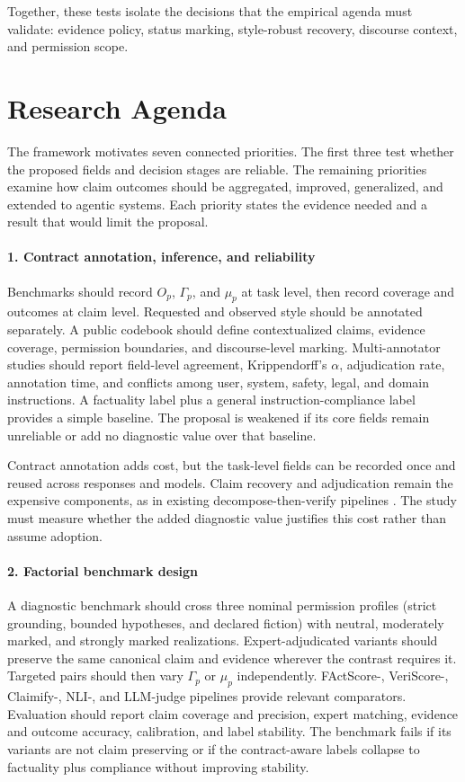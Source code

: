 \documentclass{clv2025}
\begin{document}
Together, these tests isolate the decisions that the empirical agenda must
validate: evidence policy, status marking, style-robust recovery, discourse
context, and permission scope.

\section{Research Agenda}\label{sec:agenda}

The framework motivates seven connected priorities.
The first three test whether the proposed fields and decision stages are
reliable.
The remaining priorities examine how claim outcomes should be aggregated,
improved, generalized, and extended to agentic systems.
Each priority states the evidence needed and a result that would limit the
proposal.

\paragraph{1. Contract annotation, inference, and reliability}
Benchmarks should record $O_p$, $\Gamma_p$, and $\mu_p$ at task level, then
record coverage and outcomes at claim level.
Requested and observed style should be annotated separately.
A public codebook should define contextualized claims, evidence coverage,
permission boundaries, and discourse-level marking.
Multi-annotator studies should report field-level agreement,
Krippendorff's $\alpha$, adjudication rate, annotation time, and conflicts
among user, system, safety, legal, and domain instructions.
A factuality label plus a general instruction-compliance label provides a
simple baseline.
The proposal is weakened if its core fields remain unreliable or add no
diagnostic value over that baseline.

Contract annotation adds cost, but the task-level fields can be recorded
once and reused across responses and models.
Claim recovery and adjudication remain the expensive components, as in
existing decompose-then-verify pipelines
\citep{min_factscore_2023,metropolitansky_claimify_2025}.
The study must measure whether the added diagnostic value justifies this
cost rather than assume adoption.

\paragraph{2. Factorial benchmark design}
A diagnostic benchmark should cross three nominal permission profiles
(strict grounding, bounded hypotheses, and declared fiction) with neutral,
moderately marked, and strongly marked realizations.
Expert-adjudicated variants should preserve the same canonical claim and
evidence wherever the contrast requires it.
Targeted pairs should then vary $\Gamma_p$ or $\mu_p$ independently.
FActScore-, VeriScore-, Claimify-, NLI-, and LLM-judge pipelines provide
relevant comparators.
Evaluation should report claim coverage and precision, expert matching,
evidence and outcome accuracy, calibration, and label stability.
The benchmark fails if its variants are not claim preserving or if the
contract-aware labels collapse to factuality plus compliance without
improving stability.
\end{document}

